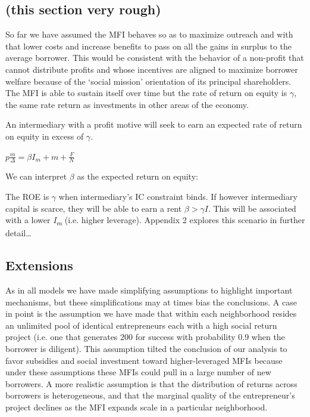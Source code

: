 \documentclass[letterpaper, 12pt]{article}
\begin{document}
\subsection{(this section very rough)}\label{this-section-very-rough}

So far we have assumed the MFI behaves so as to maximize outreach and
with that lower costs and increase benefits to pass on all the gains in
surplus to the average borrower. This would be consistent with the
behavior of a non-profit that cannot distribute profits and whose
incentives are aligned to maximize borrower welfare because of the
`social mission' orientation of its principal shareholders. The MFI is
able to sustain itself over time but the rate of return on equity is $\gamma$,
the same rate return as investments in other areas of the economy.

An intermediary with a profit motive will seek to earn an expected rate
of return on equity in excess of $\gamma$.

\(p\frac{m}{\Delta} = \beta I_{m} + m + \frac{F}{N}\)

We can interpret $\beta$ as the expected return on equity:

The ROE is $\gamma$ when intermediary's IC constraint binds. If however
intermediary capital is scarce, they will be able to earn a rent $\beta >\gamma I$. This will be associated with a lower
\emph{I\textsubscript{m }}(i.e. higher leverage). Appendix 2 explores
this scenario in further detail\ldots{}

\subsection{Extensions}\label{extensions}

As in all models we have made simplifying assumptions to highlight
important mechanisms, but these simplifications may at times bias the
conclusions. A case in point is the assumption we have made that within
each neighborhood resides an unlimited pool of identical entrepreneurs
each with a high social return project (i.e. one that generates 200 for
success with probability 0.9 when the borrower is diligent). This
assumption tilted the conclusion of our analysis to favor subsidies and
social investment toward higher-leveraged MFIs because under these
assumptions these MFIs could pull in a large number of new borrowers. A
more realistic assumption is that the distribution of returns across
borrowers is heterogeneous, and that the marginal quality of the
entrepreneur's project declines as the MFI expands scale in a particular
neighborhood.
\end{document}
